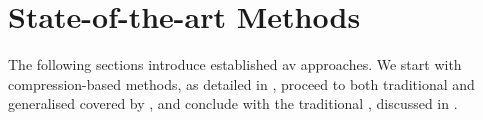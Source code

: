 \section{State-of-the-art Methods}
\label{sec:sota_methods}

The following sections introduce established \ac{av} approaches.
We start with compression-based methods, as detailed in , proceed to both traditional and generalised \unmasking{} covered by , and conclude with the traditional \impAppr{}, discussed in .




  
